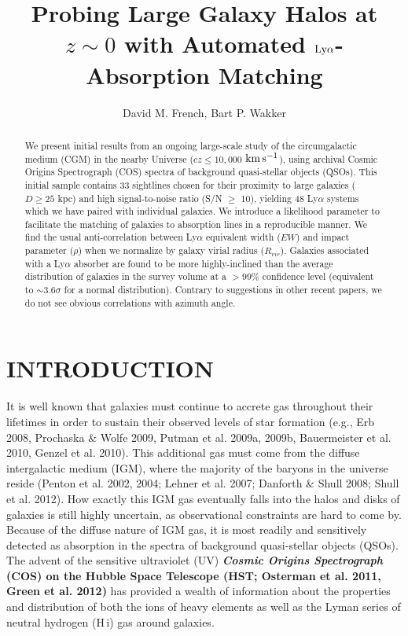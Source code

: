 \documentclass[twocolumn,tighten]{aastex6}
\begin{document}
\title{Probing Large Galaxy Halos at $z\sim0$ with Automated $\rm L \MakeLowercase{y} \alpha$-Absorption Matching}

\author{David M. French, Bart P. Wakker}


\begin{abstract}

We present initial results from an ongoing large-scale study of the circumgalactic medium (CGM) in the nearby Universe ($cz \leq 10,000$ $\rm km\, s^{-1}$), using archival Cosmic Origins Spectrograph (COS) spectra of background quasi-stellar objects (QSOs). This initial sample contains 33 sightlines chosen for their proximity to large galaxies ($D\geq25$ kpc) and high signal-to-noise ratio (S/N $\geq$ 10), yielding 48 Ly$\alpha$ systems which we have paired with individual galaxies. We introduce a likelihood parameter to facilitate the matching of galaxies to absorption lines in a reproducible manner. We find the usual anti-correlation between Ly$\alpha$ equivalent width ($EW$) and impact parameter ($\rho$) when we normalize by galaxy virial radius ($R_{vir}$). Galaxies associated with a Ly$\alpha$ absorber are found to be more highly-inclined than the average distribution of galaxies in the survey volume at a $>99\%$ confidence level (equivalent to $\sim 3.6 \sigma$ for a normal distribution). Contrary to suggestions in other recent papers, we do not see obvious correlations with azimuth angle.

\end{abstract}




\section{INTRODUCTION}

It is well known that galaxies must continue to accrete gas throughout their lifetimes in order to sustain their observed levels of star formation (e.g., Erb 2008, Prochaska $\&$ Wolfe 2009, Putman et al. 2009a, 2009b, Bauermeister et al. 2010, Genzel et al. 2010). This additional gas must come from the diffuse intergalactic medium (IGM), where the majority of the baryons in the universe reside (Penton et al. 2002, 2004; Lehner et al. 2007; Danforth $\&$ Shull 2008; Shull et al. 2012). How exactly this IGM gas eventually falls into the halos and disks of galaxies is still highly uncertain, as observational constraints are hard to come by. Because of the diffuse nature of IGM gas, it is most readily and sensitively detected as absorption in the spectra of background quasi-stellar objects (QSOs). The advent of the sensitive ultraviolet (UV) \textbf{\textit{Cosmic Origins Spectrograph} (COS) on the Hubble Space Telescope (HST; Osterman et al. 2011, Green et al. 2012)} has provided a wealth of information about the properties and distribution of both the ions of heavy elements as well as the Lyman series of neutral hydrogen (H\,{\sc i}) gas around galaxies. 
\end{document}
